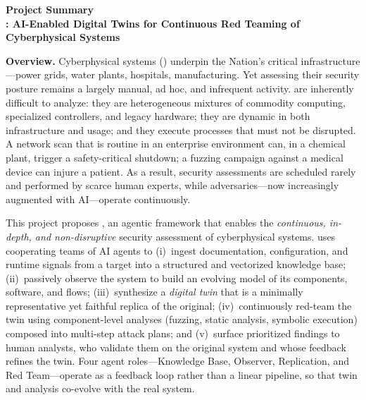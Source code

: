 
\begin{center}
  {\large\bfseries Project Summary}\\[0.3em]
  {\large\bfseries \sysname: AI-Enabled Digital Twins for Continuous Red Teaming of Cyberphysical Systems}
\end{center}

\noindent\textbf{Overview.}
Cyberphysical systems (\CPSs) underpin the Nation's critical
infrastructure---power grids, water plants, hospitals, manufacturing.
Yet assessing their security posture remains a largely manual, ad hoc,
and infrequent activity.
\CPSs are inherently difficult to analyze: they are heterogeneous
mixtures of commodity computing, specialized controllers, and legacy
hardware; they are dynamic in both infrastructure and usage; and they
execute processes that must not be disrupted. A network scan that is
routine in an enterprise environment can, in a chemical plant, trigger a
safety-critical shutdown; a fuzzing campaign against a medical device
can injure a patient. As a result, security assessments are scheduled
rarely and performed by scarce human experts, while adversaries---now
increasingly augmented with AI---operate continuously.

This project proposes \sysname, an agentic framework that enables the
\emph{continuous, in-depth, and non-disruptive} security assessment of
cyberphysical systems. \sysname uses cooperating teams of AI agents to
(i)~ingest documentation, configuration, and runtime signals from a
target \cps into a structured and vectorized knowledge base;
(ii)~passively observe the system to build an evolving model of its
components, software, and flows; (iii)~synthesize a \emph{digital twin}
that is a minimally representative yet faithful replica of the original;
(iv)~continuously red-team the twin using component-level analyses
(fuzzing, static analysis, symbolic execution) composed into multi-step
attack plans; and (v)~surface prioritized findings to human analysts,
who validate them on the original system and whose feedback refines
the twin. Four agent roles---Knowledge Base, Observer, Replication,
and Red Team---operate as a feedback loop rather than a linear
pipeline, so that twin and analysis co-evolve with the real system.

